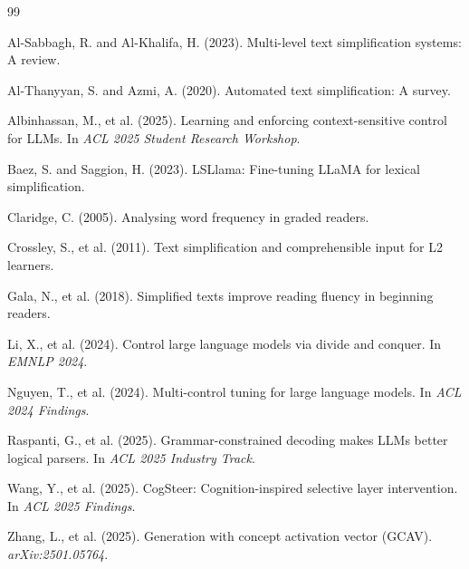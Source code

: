 \documentclass[10pt, a4paper]{article}
\begin{document}
\begin{thebibliography}{99}

Al-Sabbagh, R. and Al-Khalifa, H. (2023).
\newblock Multi-level text simplification systems: A review.

Al-Thanyyan, S. and Azmi, A. (2020).
\newblock Automated text simplification: A survey.

Albinhassan, M., et al. (2025).
\newblock Learning and enforcing context-sensitive control for LLMs.
\newblock In \textit{ACL 2025 Student Research Workshop}.

Baez, S. and Saggion, H. (2023).
\newblock LSLlama: Fine-tuning LLaMA for lexical simplification.

Claridge, C. (2005).
\newblock Analysing word frequency in graded readers.

Crossley, S., et al. (2011).
\newblock Text simplification and comprehensible input for L2 learners.

Gala, N., et al. (2018).
\newblock Simplified texts improve reading fluency in beginning readers.

Li, X., et al. (2024).
\newblock Control large language models via divide and conquer.
\newblock In \textit{EMNLP 2024}.

Nguyen, T., et al. (2024).
\newblock Multi-control tuning for large language models.
\newblock In \textit{ACL 2024 Findings}.

Raspanti, G., et al. (2025).
\newblock Grammar-constrained decoding makes LLMs better logical parsers.
\newblock In \textit{ACL 2025 Industry Track}.

Wang, Y., et al. (2025).
\newblock CogSteer: Cognition-inspired selective layer intervention.
\newblock In \textit{ACL 2025 Findings}.

Zhang, L., et al. (2025).
\newblock Generation with concept activation vector (GCAV).
\newblock \textit{arXiv:2501.05764}.

\end{thebibliography}
\end{document}
